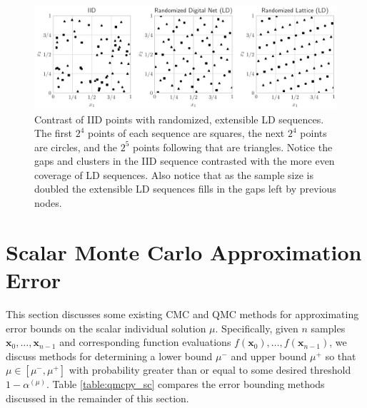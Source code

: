 \documentclass[graybox]{svmult}
\begin{document}
\begin{figure}[t]
    \centering
    \includegraphics[width=\textwidth]{figs/ld_seqs.pdf}
    \caption{Contrast of IID points with randomized, extensible LD sequences. The first $2^4$ points of each sequence are squares, the next $2^4$ points are circles, and the $2^5$ points following that are triangles. Notice the gaps and clusters in the IID sequence contrasted with the more even coverage of LD sequences. Also notice that as the sample size is doubled the extensible LD sequences fills in the gaps left by previous nodes.}
    \label{fig:ld_seqs}
\end{figure}

\section{Scalar Monte Carlo Approximation Error}\label{sec:Existing_QMC_Methods}

This section discusses some existing CMC and QMC methods for approximating error bounds on the scalar individual solution $\mu$. Specifically, given $n$ samples $\boldsymbol{x}_0,\dots,\boldsymbol{x}_{n-1}$ and corresponding function evaluations $f(\boldsymbol{x}_0),\dots,f(\boldsymbol{x}_{n-1})$, we discuss methods for determining a lower bound $\mu^-$ and upper bound $\mu^+$ so that $\mu \in [\mu^-,\mu^+]$ with probability greater than or equal to some desired threshold $1-\alpha^{(\mu)}$. Table \ref{table:qmcpy_sc} compares the error bounding methods discussed in the remainder of this section.
\end{document}

